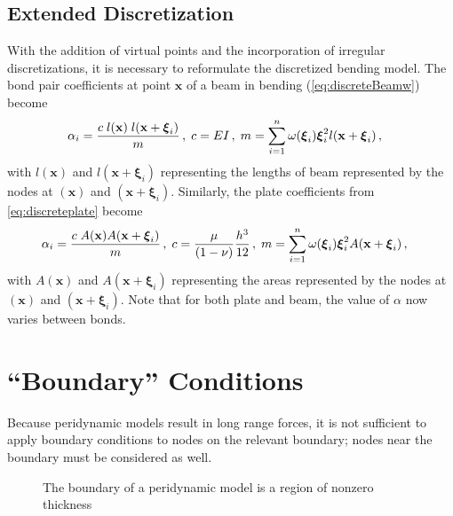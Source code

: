 \subsection{Extended Discretization}
With the addition of virtual points and the incorporation of irregular discretizations, it is necessary to reformulate the discretized bending model.
The bond pair coefficients at point $\mathbf{x}$ of a beam in bending (\cref{eq:discreteBeamw}) become
%
\begin{align}
\label{eq:discreteBeamw2}
\alpha_i &= \frac{c\; l(\mathbf{x})\;l(\mathbf{x}+\boldsymbol{\xi}_i)}{m} \,,\; c= EI \,,\; m=\sum_{i=1}^n \omega(\boldsymbol{\xi}_i)\boldsymbol{\xi}_i^2 l(\mathbf{x}+\boldsymbol{\xi}_i)\, , \notag
\end{align}
with $l(\mathbf{x})$ and $l(\mathbf{x}+\boldsymbol{\xi}_i)$ representing the lengths of beam represented by the nodes at  $(\mathbf{x})$ and $(\mathbf{x}+\boldsymbol{\xi}_i)$.
Similarly, the plate coefficients from \cref{eq:discreteplate} become
%
\begin{align}
    \alpha_i &= \frac{c\; A(\mathbf{x})A(\mathbf{x}+\boldsymbol{\xi}_i)}{m} \,,\; c= \frac{\mu}{(1-\nu)}\frac{h^3}{12}\,,\; m=\sum_{i=1}^n \omega(\boldsymbol{\xi}_i)\boldsymbol{\xi}_i^2A(\mathbf{x}+\boldsymbol{\xi}_i)\, , \notag
\end{align}
%
with $A(\mathbf{x})$ and $A(\mathbf{x}+\boldsymbol{\xi}_i)$ representing the areas represented by the nodes at  $(\mathbf{x})$ and $(\mathbf{x}+\boldsymbol{\xi}_i)$.
Note that for both plate and beam, the value of $\alpha$ now varies between bonds.
\section{``Boundary'' Conditions}
Because peridynamic models result in long range forces, it is not sufficient to apply boundary conditions to nodes on the relevant boundary; nodes near the boundary must be considered as well.
%
\begin{figure}[htbp]
  \vspace{5mm}
  \centering
  
  \caption{The boundary of a peridynamic model is a region of nonzero thickness}
  \label{fig:PDboundary}
\end{figure}
%

